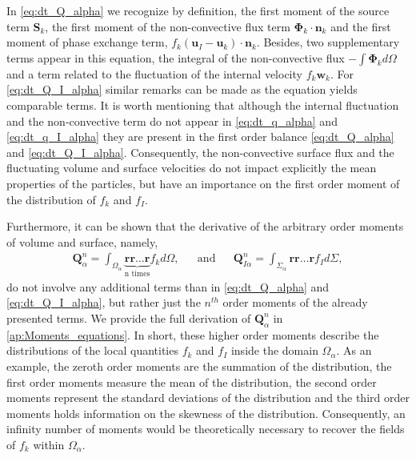 In \ref{eq:dt_Q_alpha} we recognize by definition, the first moment of the source term $\textbf{S}_k$, the first moment of the non-convective flux term $\mathbf{\Phi}_k\cdot\textbf{n}_k$ and the first moment of phase exchange term, $f_k (\textbf{u}_I-\textbf{u}_k)\cdot\textbf{n}_k$. 
Besides, two supplementary terms appear in this equation, the integral of the non-convective flux $- \int \mathbf{\Phi}_k d\Omega$ and a term related to the fluctuation of the internal velocity $f_k \textbf{w}_k$.
For \ref{eq:dt_Q_I_alpha} similar remarks can be made as the equation yields comparable terms. 
It is worth mentioning that although the internal fluctuation and the non-convective term do not appear in \ref{eq:dt_q_alpha} and \ref{eq:dt_q_I_alpha} they are present in the first order balance \ref{eq:dt_Q_alpha} and \ref{eq:dt_Q_I_alpha}.
Consequently, the non-convective surface flux and the fluctuating volume and surface velocities do not impact explicitly the mean properties of the particles, but have an importance on the first order moment of the distribution of $f_k$ and $f_I$.  

Furthermore, it can be shown that the derivative  of the arbitrary order moments of volume and surface, namely,
\begin{align}
    \textbf{Q}_\alpha^n
    = \int_{\Omega_\alpha} \underbrace{
        \textbf{r}\textbf{r}\ldots\textbf{r}
    }_{
        \text{n times}
    }
    f_k d\Omega,
    && \text{and} &&
    \textbf{Q}_{I\alpha}^n
    = \int_{\Sigma_\alpha}
        \textbf{r}\textbf{r}\ldots\textbf{r}
    f_I d\Sigma,
    \label{eq:Q_n_definition}
\end{align} 
do not involve any additional terms than in \ref{eq:dt_Q_alpha} and \ref{eq:dt_Q_I_alpha}, but rather just the $n^{th}$ order moments of the already presented terms.
We provide the full derivation of $\textbf{Q}_\alpha^n$ in \ref{ap:Moments_equations}.
In short, these higher order moments describe the distributions of the local quantities $f_k$ and $f_I$ inside the domain $\Omega_\alpha$.
As an example, the zeroth order moments are the summation of the distribution, the first order moments measure the mean of the distribution, the second order moments represent the standard deviations of the distribution and the third order moments holds information on the skewness of the distribution. 
Consequently, an infinity number of moments would be theoretically necessary to recover the fields of $f_k$ within $\Omega_\alpha$. 


